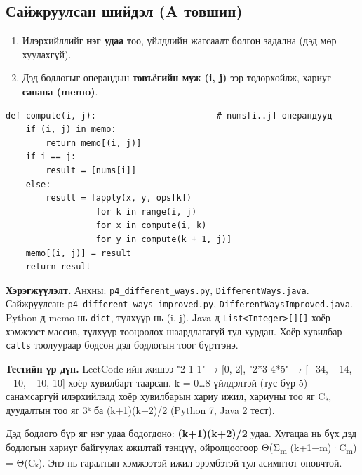 \documentclass[11pt,a4paper]{article}
\begin{document}
\subsection{Сайжруулсан шийдэл (A төвшин)}
\begin{enumerate}
\item Илэрхийллийг \textbf{нэг удаа} тоо, үйлдлийн жагсаалт болгон задална (дэд мөр хуулахгүй).
\item Дэд бодлогыг операндын \textbf{товъёгийн муж (i, j)}-ээр тодорхойлж, хариуг \textbf{санана (memo)}.
\end{enumerate}

\begin{Verbatim}
def compute(i, j):                        # nums[i..j] операндууд
    if (i, j) in memo:
        return memo[(i, j)]
    if i == j:
        result = [nums[i]]
    else:
        result = [apply(x, y, ops[k])
                  for k in range(i, j)
                  for x in compute(i, k)
                  for y in compute(k + 1, j)]
    memo[(i, j)] = result
    return result
\end{Verbatim}

\textbf{Хэрэгжүүлэлт.} Анхны: \texttt{p4\_\allowbreak{}different\_\allowbreak{}ways.\allowbreak{}py}, \texttt{DifferentWays.\allowbreak{}java}. Сайжруулсан: \texttt{p4\_\allowbreak{}different\_\allowbreak{}ways\_\allowbreak{}improved.\allowbreak{}py}, \texttt{DifferentWaysImproved.\allowbreak{}java}. Python-д memo нь \texttt{dict}, түлхүүр нь (i, j). Java-д \texttt{List<Integer>[][]} хоёр хэмжээст массив, түлхүүр тооцоолох шаардлагагүй тул хурдан. Хоёр хувилбар \texttt{calls} тоолуураар бодсон дэд бодлогын тоог бүртгэнэ.

\textbf{Тестийн үр дүн.} LeetCode-ийн жишээ "2-1-1" → [0, 2], "2*3-4*5" → [−34, −14, −10, −10, 10] хоёр хувилбарт таарсан. k = 0…8 үйлдэлтэй (тус бүр 5) санамсаргүй илэрхийлэлд хоёр хувилбарын хариу ижил, хариуны тоо яг Cₖ, дуудалтын тоо яг 3ᵏ ба (k+1)(k+2)/2 (Python 7, Java 2 тест).

Дэд бодлого бүр яг нэг удаа бодогдоно: \textbf{(k+1)(k+2)/2} удаа. Хугацаа нь бүх дэд бодлогын хариуг байгуулах ажилтай тэнцүү, ойролцоогоор Θ(Σ\textsubscript{m} (k+1−m)·C\textsubscript{m}) = Θ(Cₖ). Энэ нь гаралтын хэмжээтэй ижил эрэмбэтэй тул асимптот оновчтой.
\end{document}
